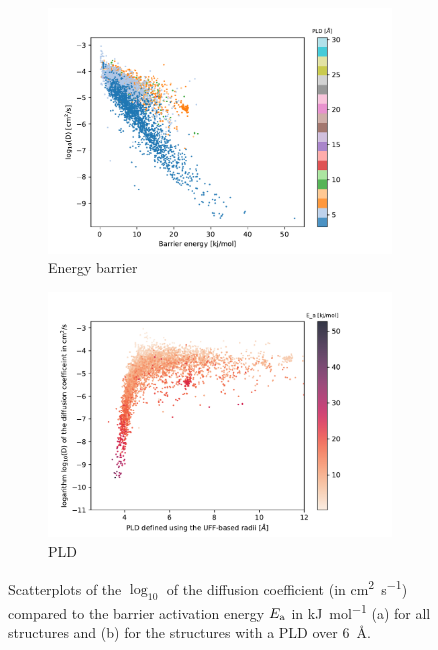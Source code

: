 \documentclass[thesis]{subfiles}
\begin{document}
\begin{otherlanguage}{french}
\begin{figure}[ht]
\centering
\begin{subfigure}[b]{0.48\textwidth}
    \centering
    \includegraphics[width=\textwidth]{figures/5-diffusion/difflog_barrier_Df_uff.pdf}
    \caption{Energy barrier}\label{fgr:barrier_diffusion_a}
\end{subfigure}
\hfill
\begin{subfigure}[b]{0.48\textwidth}
    \centering
    \includegraphics[width=\textwidth]{figures/5-diffusion/difflog_Df-uff298K_barrier.pdf}
    \caption{PLD}\label{fgr:barrier_diffusion_b}
\end{subfigure}
    \caption{ Scatterplots of the $\log_{10}$ of the diffusion coefficient (in \si{\square\cm\per\s}) compared to the barrier activation energy $E_{\text{a}}$ in \si{\kJ\per\mol} (a) for all structures  and (b) for the structures with a PLD over \SI{6}{\angstrom}.}\label{fgr:barrier_diffusion}
\end{figure}


\end{otherlanguage}
\end{document}
